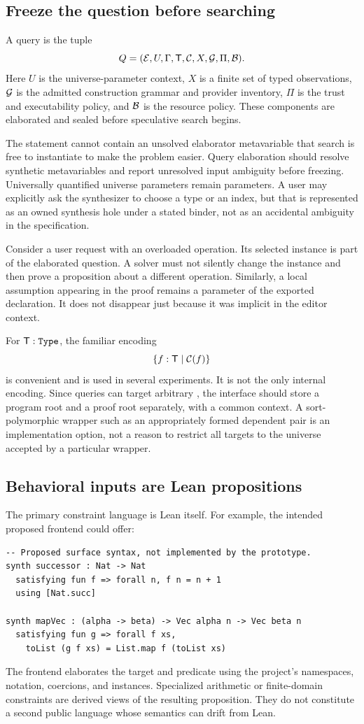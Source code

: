 \subsection{Freeze the question before searching}
A query is the tuple
\[
 Q=(\mathcal{E},U,\Gamma,\mathsf{T},\mathcal{C},X,\mathcal{G},\Pi,\mathcal{B}).
\]
Here $U$ is the universe-parameter context, $X$ is a finite set of typed observations, $\mathcal{G}$ is the admitted construction grammar and provider inventory, $\Pi$ is the trust and executability policy, and $\mathcal{B}$ is the resource policy. These components are elaborated and sealed before speculative search begins.

The statement cannot contain an unsolved elaborator metavariable that search is free to instantiate to make the problem easier. Query elaboration should resolve synthetic metavariables and report unresolved input ambiguity before freezing. Universally quantified universe parameters remain parameters. A user may explicitly ask the synthesizer to choose a type or an index, but that is represented as an owned synthesis hole under a stated binder, not as an accidental ambiguity in the specification.

Consider a user request with an overloaded operation. Its selected instance is part of the elaborated question. A solver must not silently change the instance and then prove a proposition about a different operation. Similarly, a local assumption appearing in the proof remains a parameter of the exported declaration. It does not disappear just because it was implicit in the editor context.

For $\Ty:\code{Type}$, the familiar encoding
\[
 \{f:\mathsf{T}\mid\mathcal{C}(f)\}
\]
is convenient and is used in several experiments. It is not the only internal encoding. Since queries can target arbitrary , the interface should store a program root and a proof root separately, with a common context. A sort-polymorphic wrapper such as an appropriately formed dependent pair is an implementation option, not a reason to restrict all targets to the universe accepted by a particular wrapper.

\subsection{Behavioral inputs are Lean propositions}
The primary constraint language is Lean itself. For example, the intended proposed frontend could offer:
\begin{lstlisting}
-- Proposed surface syntax, not implemented by the prototype.
synth successor : Nat -> Nat
  satisfying fun f => forall n, f n = n + 1
  using [Nat.succ]

synth mapVec : (alpha -> beta) -> Vec alpha n -> Vec beta n
  satisfying fun g => forall f xs,
    toList (g f xs) = List.map f (toList xs)
\end{lstlisting}
The frontend elaborates the target and predicate using the project's namespaces, notation, coercions, and instances. Specialized arithmetic or finite-domain constraints are derived views of the resulting proposition. They do not constitute a second public language whose semantics can drift from Lean.

